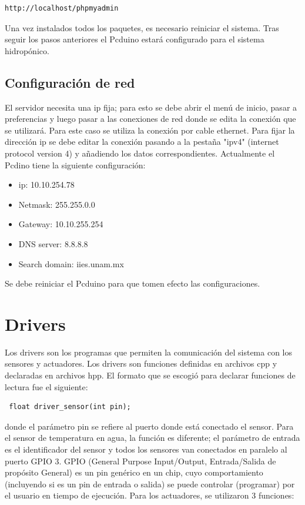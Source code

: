 \documentclass[10pt,twocolumn]{article}
\begin{document}
\begin{verbatim}
http://localhost/phpmyadmin
\end{verbatim}

Una vez instalados todos los paquetes, es necesario reiniciar el sistema. Tras seguir los pasos anteriores el Pcduino estar\'a configurado para el sistema hidrop\'onico.

\subsection{Configuraci\'on de red}
El servidor necesita una ip fija; para esto se debe abrir el men\'u de inicio, pasar a 
preferencias y luego pasar a las conexiones de red donde se edita la conexi\'on que se utilizar\'a. Para este caso se utiliza la conexi\'on por cable ethernet. 
Para fijar la direcci\'on ip se debe editar la conexi\'on pasando a 
la pesta\~na "ipv4" (internet protocol 
version 4) y a\~nadiendo los datos correspondientes. Actualmente el Pcdino tiene la siguiente configuraci\'on:

\begin{itemize}
	\item ip: 10.10.254.78
	\item Netmask: 255.255.0.0
	\item Gateway: 10.10.255.254
	\item DNS server: 8.8.8.8
	\item Search domain: iies.unam.mx
\end{itemize}

Se debe reiniciar el Pcduino para que tomen efecto las configuraciones.

\section{Drivers}
Los drivers son los programas que permiten la comunicaci\'on del sistema con los sensores y 
actuadores. Los drivers son funciones definidas en archivos cpp y declaradas en archivos hpp. El formato 
que se escogi\'o para declarar
funciones de lectura fue el siguiente: 

\begin{verbatim}
 float driver_sensor(int pin);
\end{verbatim}

donde el par\'ametro pin se refiere al puerto donde est\'a conectado el 
sensor. Para el sensor de temperatura en agua, la funci\'on es diferente; 
el par\'ametro de entrada es el identificador del sensor y todos los 
sensores van conectados en paralelo al puerto GPIO 3. GPIO (General Purpose Input/Output, Entrada/Salida de prop\'osito General) es un pin gen\'erico en un chip, 
cuyo 
comportamiento (incluyendo si es un pin
de entrada o salida) se puede controlar (programar) por el usuario en tiempo de ejecuci\'on. Para los 
actuadores, se utilizaron 3 funciones:
\end{document}
